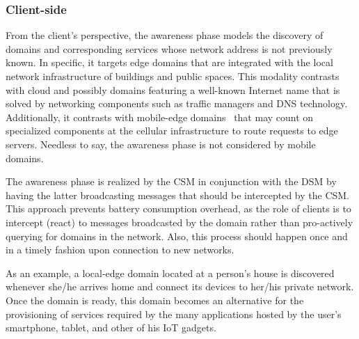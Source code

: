 \subsubsection*{Client-side} From the client's perspective, the awareness phase models the discovery of domains and corresponding services whose network address is not previously known. In specific, it targets edge domains that are integrated with the local network infrastructure of buildings and public spaces. This modality contrasts with cloud and possibly domains featuring a well-known Internet name that is solved by networking components such as traffic managers and DNS technology. Additionally, it contrasts with mobile-edge domains~\cite{ahmed2016isco} that may count on specialized components at the cellular infrastructure to route requests to edge servers. Needless to say, the awareness phase is not considered by mobile domains.

The awareness phase is realized by the CSM in conjunction with the DSM by having the latter broadcasting messages that should be intercepted by the CSM. This approach prevents battery consumption overhead, as the role of clients is to intercept (react) to messages broadcasted by the domain rather than pro-actively querying for domains in the network. Also, this process should happen once and in a timely fashion upon connection to new networks. 

As an example, a local-edge domain located at a person's house is discovered whenever she/he arrives home and connect its devices to her/his private network. Once the domain is ready, this domain becomes an alternative for the provisioning of services required by the many applications hosted by the user's smartphone, tablet, and other of his IoT gadgets. %




